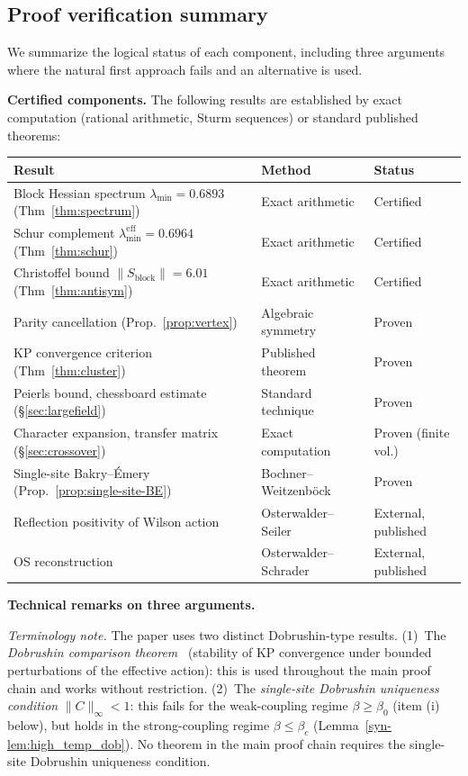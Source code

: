 \documentclass[11pt]{article}
\theoremstyle{definition}
\begin{document}
\subsection{Proof verification summary}%
\label{subsec:audit}

We summarize the logical status of each component, including
three arguments where the natural first approach fails and
an alternative is used.

\medskip\noindent\textbf{Certified components.}
The following results are established by exact computation
(rational arithmetic, Sturm sequences) or standard published
theorems:

\begin{center}
\renewcommand{\arraystretch}{1.15}
\begin{tabular}{p{5.5cm}p{3cm}p{5cm}}
\toprule
\textbf{Result} & \textbf{Method} & \textbf{Status}\\
\midrule
Block Hessian spectrum
$\lambda_{\min}=0.6893$ (Thm~\ref{thm:spectrum})
& Exact arithmetic & Certified\\
Schur complement
$\lambda_{\min}^{\mathrm{eff}}=0.6964$ (Thm~\ref{thm:schur})
& Exact arithmetic & Certified\\
Christoffel bound
$\|S_{\mathrm{block}}\|=6.01$ (Thm~\ref{thm:antisym})
& Exact arithmetic & Certified\\
Parity cancellation
(Prop.~\ref{prop:vertex})
& Algebraic symmetry & Proven\\
KP convergence criterion
(Thm~\ref{thm:cluster})
& Published theorem & Proven\\
Peierls bound, chessboard estimate
(\S\ref{sec:largefield})
& Standard technique & Proven\\
Character expansion, transfer matrix
(\S\ref{sec:crossover})
& Exact computation & Proven (finite vol.)\\
Single-site Bakry--\'Emery
(Prop.~\ref{prop:single-site-BE})
& Bochner--Weitzenb\"ock & Proven\\
Reflection positivity of Wilson action
& Osterwalder--Seiler~\cite{OS78} & External, published\\
OS reconstruction
& Osterwalder--Schrader~\cite{OS73} & External, published\\
\bottomrule
\end{tabular}
\end{center}

\medskip\noindent\textbf{Technical remarks on three arguments.}

\emph{Terminology note.}
The paper uses two distinct Dobrushin-type results.
(1)~The \emph{Dobrushin comparison theorem}~\cite{Dobrushin}
(stability of KP convergence under bounded perturbations
of the effective action): this is used throughout the main
proof chain and works without restriction.
(2)~The \emph{single-site Dobrushin uniqueness condition}
$\|C\|_\infty<1$: this fails for the weak-coupling regime
$\beta\ge\beta_0$ (item (i) below), but holds in the
strong-coupling regime $\beta\le\beta_c$
(Lemma~\ref{syn-lem:high_temp_dob}).
No theorem in the main proof chain requires the single-site
Dobrushin uniqueness condition.
\end{document}
